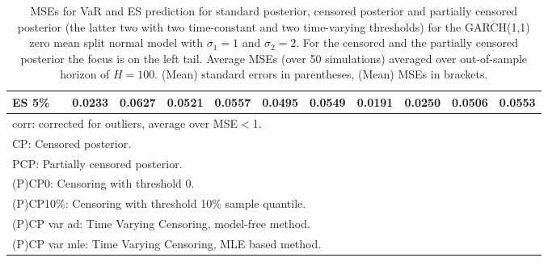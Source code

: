 {{\begin{sidewaystable}
\begin{tabular}{cc cc | cccc | cccc}
ES 5\%
&& 0.0233 & 0.0627 & 0.0521 & 0.0557 & 0.0495 & 0.0549 &0.0191 & 0.0250 & 0.0506 & 0.0553 \\ 
\hline 
\multicolumn{12}{l}{\footnotesize{corr: corrected for outliers, average over MSE$<$1.}}  \\ 
\multicolumn{12}{l}{\footnotesize{CP: Censored posterior.}}  \\ 
\multicolumn{12}{l}{\footnotesize{PCP: Partially censored posterior.}} \\ 
\multicolumn{12}{l}{\footnotesize{(P)CP0: Censoring with threshold 0.}} \\ 
\multicolumn{12}{l}{\footnotesize{(P)CP10\%: Censoring with threshold 10\% sample quantile.}}  \\ 
\multicolumn{12}{l}{\footnotesize{(P)CP var ad: Time Varying Censoring, model-free method.}} \\ 
\multicolumn{12}{l}{\footnotesize{(P)CP var mle: Time Varying Censoring, MLE based method.}}  \\ 
\end{tabular}
\caption{MSEs for VaR and ES prediction for standard posterior, censored posterior and partially censored posterior (the latter two with two time-constant and two time-varying thresholds) for the GARCH(1,1) zero mean split normal model with $\sigma_{1} = 1$ and $\sigma_{2} = 2$. For the censored and the partially censored posterior the focus is on the left tail. Average MSEs (over 50 simulations) averaged over out-of-sample horizon of $H=100$. (Mean) standard errors in parentheses, (Mean) MSEs in brackets.} 
\label{tab:garch11_pcp_var}  
\end{sidewaystable}
}
}